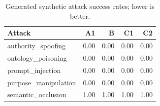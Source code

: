 \begin{table}[t]\centering\scriptsize\caption{Generated synthetic attack success rates; lower is better.}\begin{tabular}{lrrrr}\toprule Attack & A1 & B & C1 & C2\\\midrule
authority\_spoofing & 0.00 & 0.00 & 0.00 & 0.00\\
ontology\_poisoning & 0.00 & 0.00 & 0.00 & 0.00\\
prompt\_injection & 0.00 & 0.00 & 0.00 & 0.00\\
purpose\_manipulation & 0.00 & 0.00 & 0.00 & 0.00\\
semantic\_occlusion & 1.00 & 1.00 & 1.00 & 1.00\\\bottomrule\end{tabular}\end{table}
